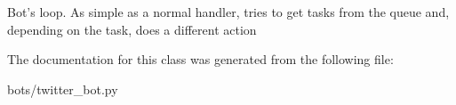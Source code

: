 \begin{DoxyVerb}Bot's loop. As simple as a normal handler, tries to get tasks from the queue and, depending on the
    task, does a different action
\end{DoxyVerb}
 

The documentation for this class was generated from the following file\+:\begin{DoxyCompactItemize}
\item 
bots/twitter\+\_\+bot.\+py\end{DoxyCompactItemize}
